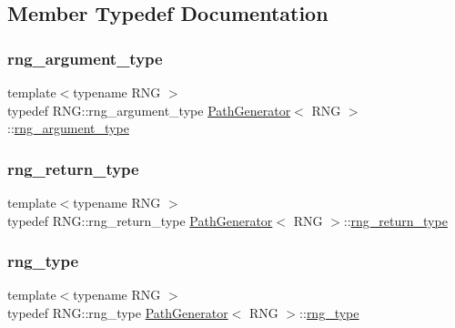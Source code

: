 \subsection{Member Typedef Documentation}
\hypertarget{class_path_generator_ae1055b21996819be953fb102e5980c18}{}\label{class_path_generator_ae1055b21996819be953fb102e5980c18} 
\subsubsection{\texorpdfstring{rng\+\_\+argument\+\_\+type}{rng\_argument\_type}}
{\footnotesize\ttfamily template$<$typename R\+NG $>$ \\
typedef R\+N\+G\+::rng\+\_\+argument\+\_\+type \hyperlink{class_path_generator}{Path\+Generator}$<$ R\+NG $>$\+::\hyperlink{class_path_generator_ae1055b21996819be953fb102e5980c18}{rng\+\_\+argument\+\_\+type}}

\hypertarget{class_path_generator_a7e88a4843d6bb3488b62b1516760a031}{}\label{class_path_generator_a7e88a4843d6bb3488b62b1516760a031} 
\subsubsection{\texorpdfstring{rng\+\_\+return\+\_\+type}{rng\_return\_type}}
{\footnotesize\ttfamily template$<$typename R\+NG $>$ \\
typedef R\+N\+G\+::rng\+\_\+return\+\_\+type \hyperlink{class_path_generator}{Path\+Generator}$<$ R\+NG $>$\+::\hyperlink{class_path_generator_a7e88a4843d6bb3488b62b1516760a031}{rng\+\_\+return\+\_\+type}}

\hypertarget{class_path_generator_a519a5baf42ff4c7c1addc9a4f2826b12}{}\label{class_path_generator_a519a5baf42ff4c7c1addc9a4f2826b12} 
\subsubsection{\texorpdfstring{rng\+\_\+type}{rng\_type}}
{\footnotesize\ttfamily template$<$typename R\+NG $>$ \\
typedef R\+N\+G\+::rng\+\_\+type \hyperlink{class_path_generator}{Path\+Generator}$<$ R\+NG $>$\+::\hyperlink{class_path_generator_a519a5baf42ff4c7c1addc9a4f2826b12}{rng\+\_\+type}}



